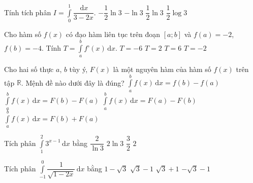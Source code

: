 \begin{ex}%
	Tính tích phân $I=\displaystyle\int\limits_0^1\dfrac{\mathrm{\,d}x}{3-2x}$. 
	\choice
	{$-\dfrac{1}{2}\ln 3$}
	{$-\ln 3$}
	{\True $\dfrac{1}{2}\ln 3$}
	{$\dfrac{1}{2}\log 3$}
\end{ex}
\begin{ex}%
	Cho hàm số $f(x)$ có đạo hàm liên tục trên đoạn $[a; b]$ và $f(a)=-2$, $f(b)=-4$. Tính $T=\displaystyle\int\limits_a^b f’(x)\mathrm{\,d}x$. 
	\choice
	{$T=-6$}
	{$T=2$}
	{$T=6$}
	{\True $T=-2$}
\end{ex}
\begin{ex}%
	Cho hai số thực $a$, $b$ tùy ý, $F(x)$ là một nguyên hàm của hàm số $f(x)$ trên tập $\mathbb{R}$. Mệnh đề nào dưới đây là đúng?
	\choice
	{$\displaystyle\int\limits_a^b f(x)\mathrm{\,d}x=f(b)-f(a)$}
	{\True $\displaystyle\int\limits_a^b f(x)\mathrm{\,d}x=F(b)-F(a)$}
	{$\displaystyle\int\limits_a^b f(x)\mathrm{\,d}x=F(a)-F(b)$}
	{$\displaystyle\int\limits_a^b f(x)\mathrm{\,d}x=F(b)+F(a)$}
\end{ex}
\begin{ex}%
	Tích phân $\displaystyle\int\limits_1^2 3^{x-1}\mathrm{\,d}x$ bằng
	\choice
	{\True $\dfrac{2}{\ln 3}$}
	{$2\ln 3$}
	{$\dfrac{3}{2}$}
	{$2$}
\end{ex}
\begin{ex}%
	Tích phân $\displaystyle\int\limits_{-1}^{0}\dfrac{1}{\sqrt{1-2x}}\mathrm{\,d}x$ bằng
	\choice
	{$1-\sqrt{3}$}
	{\True $\sqrt{3}-1$}
	{$\sqrt{3}+1$}
	{$-\sqrt{3}-1$}
\end{ex}

